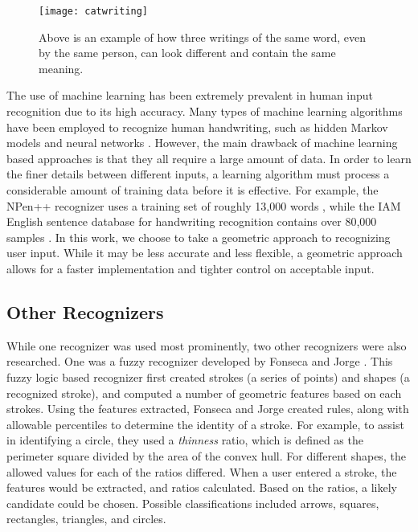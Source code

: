 \begin{figure}[ht]
\centering
\texttt{[image: catwriting]}
\caption[Examples of handwriting variations]{Above is an example of how three writings of the same word, even by the same person, can look different and contain the same meaning.}
\label{fig:handwriting}
\end{figure}

The use of machine learning has been extremely prevalent in human input recognition due to its high accuracy. Many types of machine learning algorithms have been employed to recognize human handwriting, such as hidden Markov models \cite{hmm1994} and neural networks \cite{neural2011}. However, the main drawback of machine learning based approaches is that they all require a large amount of data. In order to learn the finer details between different inputs, a learning algorithm must process a considerable amount of training data before it is effective. For example, the NPen++ recognizer uses a training set of roughly 13,000 words \cite{npen}, while the IAM English sentence database for handwriting recognition contains over 80,000 samples \cite{iamdatabase}. In this work, we choose to take a geometric approach to recognizing user input. While it may be less accurate and less flexible, a geometric approach allows for a faster implementation and tighter control on acceptable input. \\

\subsection{Other Recognizers}

While one recognizer was used most prominently, two other recognizers were also researched. One was a fuzzy recognizer developed by Fonseca and Jorge \cite{fuzzylogic}. This fuzzy logic based recognizer first created strokes (a series of points) and shapes (a recognized stroke), and computed a number of geometric features based on each strokes. Using the features extracted, Fonseca and Jorge created rules, along with allowable percentiles to determine the identity of a stroke. For example, to assist in identifying a circle, they used a \textit{thinness} ratio, which is defined as the perimeter square divided by the area of the convex hull. For different shapes, the allowed values for each of the ratios differed. When a user entered a stroke, the features would be extracted, and ratios calculated. Based on the ratios, a likely candidate could be chosen. Possible classifications included arrows, squares, rectangles, triangles, and circles. \\

